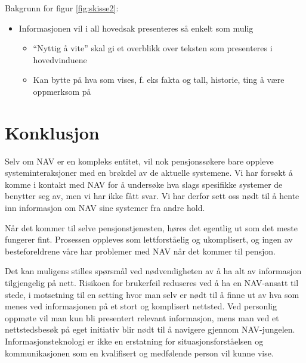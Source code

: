 \documentclass[informationsecurity]{gucmasterproject}
\begin{document}
Bakgrunn for figur \ref{fig:skisse2}:
\begin{itemize}
\item Informasjonen vil i all hovedsak presenteres så enkelt som mulig
\begin{itemize}
\item “Nyttig å vite” skal gi et overblikk over teksten som presenteres i hovedvinduene
\item Kan bytte på hva som vises, f. eks fakta og tall, historie, ting å være oppmerksom på
\end{itemize}
\end{itemize}

\chapter{Konklusjon}
Selv om NAV er en kompleks entitet, vil nok pensjonssøkere bare oppleve systeminteraksjoner med en brøkdel av de aktuelle systemene. Vi har forsøkt å komme i kontakt med NAV for å undersøke hva slags spesifikke systemer de benytter seg av, men vi har ikke fått svar. Vi har derfor sett oss nødt til å hente inn informasjon om NAV sine systemer fra andre hold.

Når det kommer til selve pensjonstjenesten, høres det egentlig ut som det meste fungerer fint. Prosessen oppleves som lettforståelig og ukomplisert, og ingen av besteforeldrene våre har problemer med NAV når det kommer til pensjon.

Det kan muligens stilles spørsmål ved nødvendigheten av å ha alt av informasjon tilgjengelig på nett. Risikoen for brukerfeil reduseres ved å ha en NAV-ansatt til stede, i motsetning til en setting hvor man selv er nødt til å finne ut av hva som menes ved informasjonen på et stort og komplisert nettsted. Ved personlig oppmøte vil man kun bli presentert relevant informasjon, mens man ved et nettstedsbesøk på eget initiativ blir nødt til å navigere gjennom NAV-jungelen. Informasjonsteknologi er ikke en erstatning for situasjonsforståelsen og kommunikasjonen som en kvalifisert og medfølende person vil kunne vise.
\end{document}
